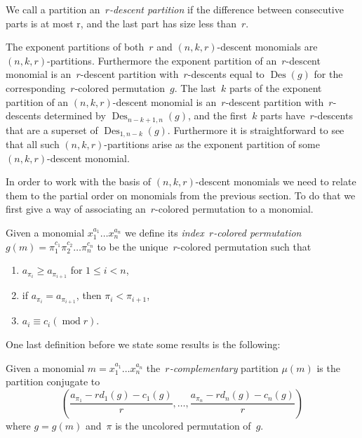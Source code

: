 \documentclass[10pt]{article}
\newcommand{\modrm}{\operatorname{mod}}\newcommand{\Des}{\operatorname{Des}}\newcommand{\des}{\operatorname{des}}
\begin{document}
\begin{defi}
	We call a partition an~\emph{$r$-descent partition} if the difference between consecutive parts is at most r, and the last 
part has size less than~$r$. 
\end{defi}

	The exponent partitions of both~$r$ and $(n,k,r)$-descent monomials are $(n,k,r)$-partitions. Furthermore the exponent 
partition of an~$r$-descent monomial is an~$r$-descent partition with~$r$-descents equal to $\Des (g)$ for the 
corresponding~$r$-colored permutation~$g$. The last~$k$ parts of the exponent partition of an $(n,k,r)$-descent 
monomial is an~$r$-descent partition with~$r$-descents determined by $\Des _{n-k+1,n}(g)$, and the first~$k$ parts have~$r$-descents that are a superset of $\Des _{1,n-k}(g)$. Furthermore it is straightforward to see that all such 
$(n,k,r)$-partitions arise as the exponent partition of some $(n,k,r)$-descent monomial.

	In order to work with the basis of $(n,k,r)$-descent monomials we need to relate them to the partial order on monomials 
from the previous section. To do that we first give a way of associating an~$r$-colored permutation to a monomial.

	\begin{defi}

		Given a monomial $x_1^{a_1}\ldots x_n^{a_n}$ we define its \emph{index~$r$-colored permutation} 
$g(m)=\pi_1^{c_1}\pi_2^{c_2}\ldots \pi_n^{c_n}$ to be the unique~$r$-colored permutation such that
		\begin{enumerate}
			\item $a_{\pi_i}\geq a_{\pi_{i+1}}$ for $1\leq i<n$,
			\item if $a_{\pi_i}=a_{\pi_{i+1}}$, then $\pi_i<\pi_{i+1}$,
			\item $a_i\equiv c_i (\modrm r)$.
		\end{enumerate}
	\end{defi}

	One last definition before we state some results is the following:

	\begin{defi}

		Given a monomial $m=x_1^{a_1}\ldots x_n^{a_n}$ the~\emph{$r$-complementary} partition $\mu(m)$ is the partition 
conjugate to
\begin{equation}
\left( 
\frac{a_{\pi_1}-rd_1(g)-c_1(g)}{r},\ldots,\frac{a_{\pi_n}-rd_n(g)-c_n(g)}{r}\right)
\end{equation}
where $g=g(m)$ and~$\pi$ is the uncolored permutation of~$g$. 

	\end{defi}
\end{document}
